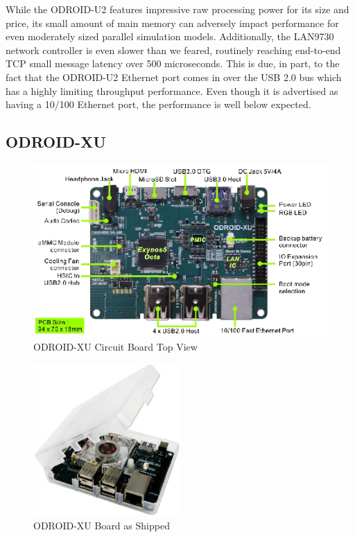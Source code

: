\documentclass[11pt]{book}
\begin{document}

While the ODROID-U2 features impressive raw processing power for its size and
price, its small amount of main memory can adversely impact performance for even
moderately sized parallel simulation models.  Additionally, the LAN9730 network
controller is even slower than we feared, routinely reaching end-to-end TCP
small message latency over 500 microseconds.  This is due, in part, to the fact that the
ODROID-U2 Ethernet port comes in over the USB 2.0 bus which has a highly limiting
throughput performance.  Even though it is advertised as having a 10/100 Ethernet port,
the performance is well below expected.

\subsection{ODROID-XU}

\begin{figure}
\includegraphics[width=\textwidth]{odroid_xu_top}
\caption{ODROID-XU Circuit Board Top View \cite{odroid-xu-board-detail}}
\label{odroid-xu-board}
\end{figure}

\begin{figure}
\centering
\includegraphics[width=0.5\textwidth]{odroid_xu}
\caption{ODROID-XU Board as Shipped \cite{odroid-xu-board-detail}}
\label{odroid-xu}
\end{figure}
\end{document}
